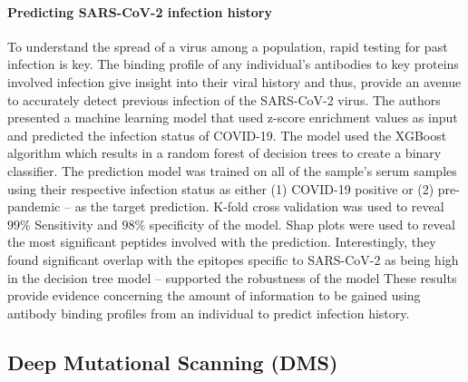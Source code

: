 \documentclass{article}
\begin{document}
\paragraph{Predicting SARS-CoV-2 infection history} 
To understand the spread of a virus among a population, rapid testing for past infection is key.
The binding profile of any individual's antibodies to key proteins involved infection give insight into their viral history and thus, provide an avenue to accurately detect previous infection of the SARS-CoV-2 virus.
The authors presented a machine learning model that used z-score enrichment values as input and predicted the infection status of COVID-19.
The model used the XGBoost algorithm which results in a random forest of decision trees to create a binary classifier.
The prediction model was trained on all of the sample's serum samples using their respective infection status as either (1) COVID-19 positive or (2) pre-pandemic -- as the target prediction.
K-fold cross validation was used to reveal $99\%$ Sensitivity and $98\%$ specificity of the model.
Shap plots were used to reveal the most significant peptides involved with the prediction.
Interestingly, they found significant overlap with the epitopes specific to SARS-CoV-2 as being high in the decision tree model -- supported the robustness of the model
These results provide evidence concerning the amount of information to be gained using antibody binding profiles from an individual to predict infection history.

\subsection*{Deep Mutational Scanning (DMS)}
\end{document}
